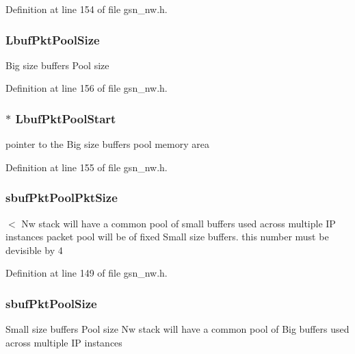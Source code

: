 Definition at line 154 of file gsn\_\-nw.h.

\hypertarget{a00165_abe315d85e0bbf81d2568542b0f985562}{
\subsubsection[{LbufPktPoolSize}]{ {\bf LbufPktPoolSize}}}
\label{a00165_abe315d85e0bbf81d2568542b0f985562}
Big size buffers Pool size 

Definition at line 156 of file gsn\_\-nw.h.

\hypertarget{a00165_a0341b72d92e2eade898dcac939f80ab7}{
\subsubsection[{LbufPktPoolStart}]{$\ast$ {\bf LbufPktPoolStart}}}
\label{a00165_a0341b72d92e2eade898dcac939f80ab7}
pointer to the Big size buffers pool memory area 

Definition at line 155 of file gsn\_\-nw.h.

\hypertarget{a00165_a42386fb051a55ad1c912c6cab2f5aae4}{
\subsubsection[{sbufPktPoolPktSize}]{ {\bf sbufPktPoolPktSize}}}
\label{a00165_a42386fb051a55ad1c912c6cab2f5aae4}
$<$ Nw stack will have a common pool of small buffers used across multiple IP instances packet pool will be of fixed Small size buffers. this number must be devisible by 4 

Definition at line 149 of file gsn\_\-nw.h.

\hypertarget{a00165_a0972f4539914c0e91b5da2561ab4eefa}{
\subsubsection[{sbufPktPoolSize}]{ {\bf sbufPktPoolSize}}}
\label{a00165_a0972f4539914c0e91b5da2561ab4eefa}
Small size buffers Pool size Nw stack will have a common pool of Big buffers used across multiple IP instances 

